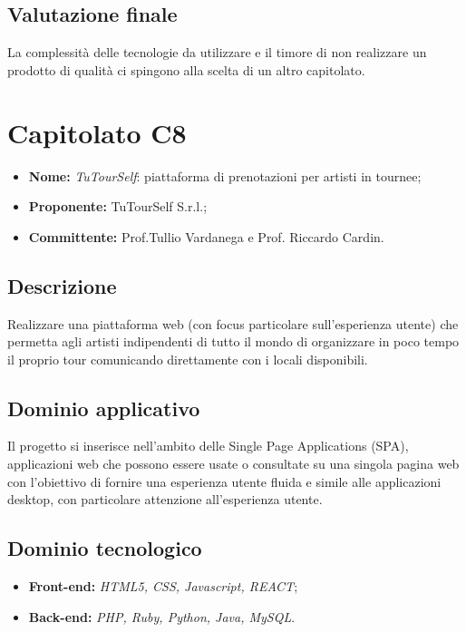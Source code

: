 \documentclass[openany,12pt,a4paper]{report}
\begin{document}
	\subsection{Valutazione finale}

	La complessità delle tecnologie da utilizzare e il timore di non realizzare un prodotto di qualità ci spingono alla scelta di un altro capitolato.


	\section{Capitolato C8}

	\begin{itemize}
		\item \textbf{Nome:} \textit{TuTourSelf}: piattaforma di prenotazioni per artisti in tournee;
		\item \textbf{Proponente:} TuTourSelf S.r.l.;
		\item \textbf{Committente:} Prof.Tullio Vardanega e Prof. Riccardo Cardin.
	\end{itemize}

	\subsection{Descrizione}

	Realizzare una piattaforma web (con focus particolare sull'esperienza utente) che permetta agli artisti indipendenti di tutto il mondo di organizzare in poco tempo il proprio tour comunicando direttamente con i locali disponibili.

	\subsection{Dominio applicativo}

	Il progetto si inserisce nell'ambito delle Single Page Applications (SPA), applicazioni web che possono essere usate o consultate su una singola pagina web con l'obiettivo di fornire una esperienza utente fluida e simile alle applicazioni desktop, con particolare attenzione all'esperienza utente.

	\subsection{Dominio tecnologico}

	\begin{itemize}
		\item \textbf{Front-end:} \textit{HTML5, CSS, Javascript, REACT};
		\item \textbf{Back-end:}  \textit{PHP, Ruby, Python, Java, MySQL}.
	\end{itemize}
\end{document}
